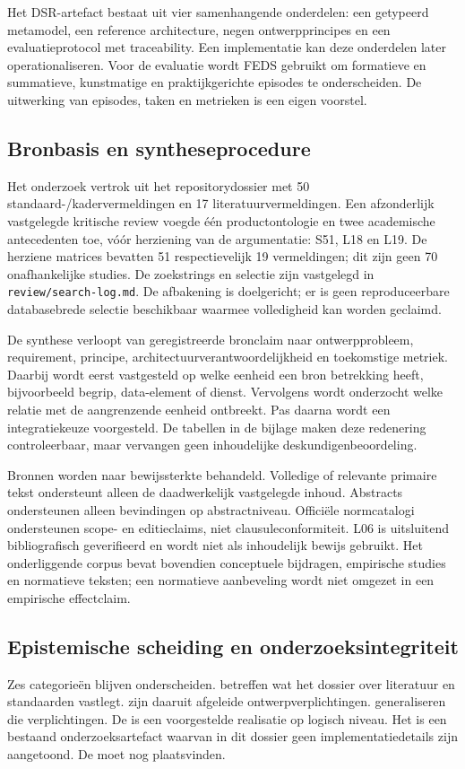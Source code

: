 Het DSR-artefact bestaat uit vier samenhangende onderdelen: een getypeerd metamodel, een reference architecture, negen ontwerpprincipes en een evaluatieprotocol met traceability. Een implementatie kan deze onderdelen later operationaliseren. Voor de evaluatie wordt FEDS gebruikt om formatieve en summatieve, kunstmatige en praktijkgerichte episodes te onderscheiden. \citep{L03} De uitwerking van episodes, taken en metrieken is een eigen voorstel.

\subsection{Bronbasis en syntheseprocedure}
Het onderzoek vertrok uit het repositorydossier met 50 standaard-/kadervermeldingen en 17 literatuurvermeldingen. Een afzonderlijk vastgelegde kritische review voegde één productontologie en twee academische antecedenten toe, vóór herziening van de argumentatie: S51, L18 en L19. De herziene matrices bevatten 51 respectievelijk 19 vermeldingen; dit zijn geen 70 onafhankelijke studies. De zoekstrings en selectie zijn vastgelegd in \texttt{review/search-log.md}. De afbakening is doelgericht; er is geen reproduceerbare databasebrede selectie beschikbaar waarmee volledigheid kan worden geclaimd.

De synthese verloopt van geregistreerde bronclaim naar ontwerpprobleem, requirement, principe, architectuurverantwoordelijkheid en toekomstige metriek. Daarbij wordt eerst vastgesteld op welke eenheid een bron betrekking heeft, bijvoorbeeld begrip, data-element of dienst. Vervolgens wordt onderzocht welke relatie met de aangrenzende eenheid ontbreekt. Pas daarna wordt een integratiekeuze voorgesteld. De tabellen in de bijlage maken deze redenering controleerbaar, maar vervangen geen inhoudelijke deskundigenbeoordeling.

Bronnen worden naar bewijssterkte behandeld. Volledige of relevante primaire tekst ondersteunt alleen de daadwerkelijk vastgelegde inhoud. Abstracts ondersteunen alleen bevindingen op abstractniveau. Officiële normcatalogi ondersteunen scope- en editieclaims, niet clausuleconformiteit. L06 is uitsluitend bibliografisch geverifieerd en wordt niet als inhoudelijk bewijs gebruikt. Het onderliggende corpus bevat bovendien conceptuele bijdragen, empirische studies en normatieve teksten; een normatieve aanbeveling wordt niet omgezet in een empirische effectclaim.

\subsection{Epistemische scheiding en onderzoeksintegriteit}
Zes categorieën blijven onderscheiden.  betreffen wat het dossier over literatuur en standaarden vastlegt.  zijn daaruit afgeleide ontwerpverplichtingen.  generaliseren die verplichtingen. De  is een voorgestelde realisatie op logisch niveau. Het  is een bestaand onderzoeksartefact waarvan in dit dossier geen implementatiedetails zijn aangetoond. De  moet nog plaatsvinden.

